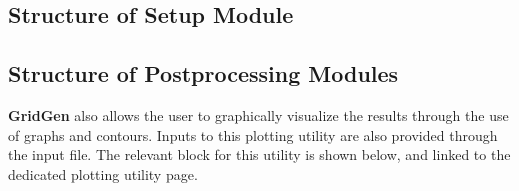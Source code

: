 \documentclass[letterpaper,10pt,english]{sphinxmanual}
\begin{document}
\subsection{Structure of Setup Module}
\label{\detokenize{inputfile:str-setup}}\label{\detokenize{inputfile:structure-of-setup-module}}
\begin{sphinxVerbatim}[commandchars=\\\{\}]
\end{sphinxVerbatim}


\subsection{Structure of Postprocessing Modules}
\label{\detokenize{inputfile:str-post}}\label{\detokenize{inputfile:structure-of-postprocessing-modules}}\label{\detokenize{inputfile:plot-input}}
{\color{red}\bfseries{}\textbar{}GridGen\textbar{}} also allows the user to graphically visualize the results through the use of graphs and contours. Inputs to this plotting utility are also provided through the input file. The relevant block for this utility is shown below, and linked to the dedicated plotting utility page.
\end{document}
